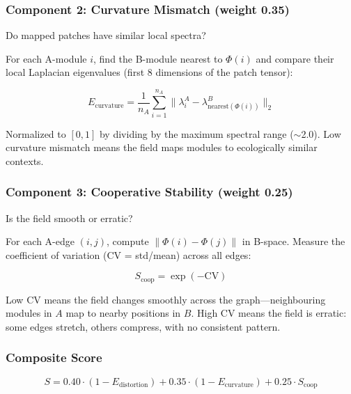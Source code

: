 \documentclass{../yalumba}
\begin{document}
\subsubsection{Component 2: Curvature Mismatch (weight 0.35)}

Do mapped patches have similar local spectra?

For each A-module $i$, find the B-module nearest to $\Phi(i)$ and compare
their local Laplacian eigenvalues (first 8 dimensions of the patch tensor):

\begin{equation}
  E_{\text{curvature}} = \frac{1}{n_A} \sum_{i=1}^{n_A}
    \|\lambda^A_i - \lambda^B_{\text{nearest}(\Phi(i))}\|_2
  \label{eq:curvature}
\end{equation}

Normalized to $[0, 1]$ by dividing by the maximum spectral range ($\sim$2.0).
Low curvature mismatch means the field maps modules to ecologically similar
contexts.

\subsubsection{Component 3: Cooperative Stability (weight 0.25)}

Is the field smooth or erratic?

For each A-edge $(i, j)$, compute $\|\Phi(i) - \Phi(j)\|$ in B-space.
Measure the coefficient of variation (CV = std/mean) across all edges:

\begin{equation}
  S_{\text{coop}} = \exp(-\text{CV})
  \label{eq:stability}
\end{equation}

Low CV means the field changes smoothly across the graph---neighbouring
modules in $A$ map to nearby positions in $B$.  High CV means the field
is erratic: some edges stretch, others compress, with no consistent pattern.


\subsubsection{Composite Score}

\begin{equation}
  S = 0.40 \cdot (1 - E_{\text{distortion}})
    + 0.35 \cdot (1 - E_{\text{curvature}})
    + 0.25 \cdot S_{\text{coop}}
  \label{eq:composite}
\end{equation}
\end{document}
